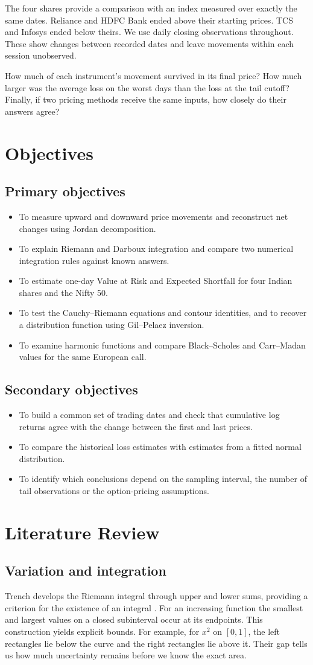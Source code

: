 \documentclass[12pt,a4paper]{article}
\newcommand{\chapterpage}[1]{\clearpage\section{#1}}
\newcommand{\out}[1]{\par\medskip{\color{ink}\bfseries #1}\par}
\begin{document}
The four shares provide a comparison with an index measured over exactly the same dates. Reliance and HDFC Bank ended above their starting prices. TCS and Infosys ended below theirs. We use daily closing observations throughout. These show changes between recorded dates and leave movements within each session unobserved.
\out{Questions guiding the study}
How much of each instrument's movement survived in its final price? How much larger was the average loss on the worst days than the loss at the tail cutoff? Finally, if two pricing methods receive the same inputs, how closely do their answers agree?
\chapterpage{Objectives}
\subsection{Primary objectives}
\begin{itemize}
\item To measure upward and downward price movements and reconstruct net changes using Jordan decomposition.
\item To explain Riemann and Darboux integration and compare two numerical integration rules against known answers.
\item To estimate one-day Value at Risk and Expected Shortfall for four Indian shares and the Nifty 50.
\item To test the Cauchy--Riemann equations and contour identities, and to recover a distribution function using Gil--Pelaez inversion.
\item To examine harmonic functions and compare Black--Scholes and Carr--Madan values for the same European call.
\end{itemize}
\subsection{Secondary objectives}
\begin{itemize}
\item To build a common set of trading dates and check that cumulative log returns agree with the change between the first and last prices.
\item To compare the historical loss estimates with estimates from a fitted normal distribution.
\item To identify which conclusions depend on the sampling interval, the number of tail observations or the option-pricing assumptions.
\end{itemize}
\chapterpage{Literature Review}
\subsection{Variation and integration}
Trench develops the Riemann integral through upper and lower sums, providing a criterion for the existence of an integral \cite{trench}. For an increasing function the smallest and largest values on a closed subinterval occur at its endpoints. This construction yields explicit bounds. For example, for $x^2$ on $[0,1]$, the left rectangles lie below the curve and the right rectangles lie above it. Their gap tells us how much uncertainty remains before we know the exact area.
 
\end{document}

